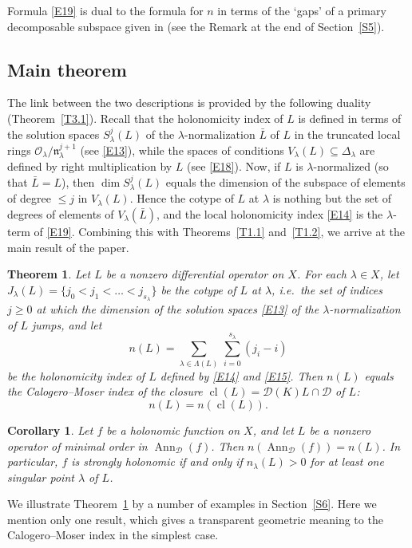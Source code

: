 \documentclass[11pt,reqno]{amsart}
\theoremstyle{plain}
\newtheorem{theorem}{Theorem}[section]
\newtheorem{corollary}{Corollary}[section]
\theoremstyle{definition}
\theoremstyle{remark}
\numberwithin{equation}{section}
\newcommand{\cD}{\mathcal{D}}
\newcommand{\cO}{\mathcal{O}}
\newcommand{\nl}{\mathfrak{n}_\lambda}
\newcommand{\Dl}{\Delta_\lambda}
\DeclareMathOperator{\Ann}{Ann}
\DeclareMathOperator{\cl}{cl}
\begin{document}
Formula \eqref{E19} is dual to the formula for $n$ in terms of the `gaps' of a primary
decomposable subspace given in \cite[(8.3)]{BerestWilson04} (see the Remark at the end of
Section~\ref{S5}).

\subsection*{Main theorem}
The link between the two descriptions is provided by the following duality
(Theorem~\ref{T3.1}). Recall that the holonomicity index of $L$ is defined in terms of the
solution spaces $S^j_\lambda(L)$ of the $\lambda$-normalization $\bar L$ of $L$ in the truncated
local rings $\cO_\lambda/\nl^{j+1}$ (see \eqref{E13}), while the spaces of conditions
$V_\lambda(L) \subseteq \Dl$ are defined by right multiplication by $L$ (see \eqref{E18}). Now, if
$L$ is $\lambda$-normalized (so that $\bar L = L$), then $\dim S^j_\lambda(L)$ equals the
dimension of the subspace of elements of degree $\le j$ in $V_\lambda(L)$. Hence the cotype of $L$ at $\lambda$ is nothing
but the set of degrees of elements of $V_\lambda(\bar L)$, and the local holonomicity index
\eqref{E14} is the $\lambda$-term of \eqref{E19}. Combining this with Theorems~\ref{T1.1}
and~\ref{T1.2}, we arrive at the main result of the paper.

\begin{theorem}
\label{T1.3}
Let $L$ be a nonzero differential operator on $X$. For each $\lambda \in X$, let
$J_\lambda(L) = \{ j_0 < j_1 < \ldots < j_{s_\lambda} \}$ be the cotype of $L$ at $\lambda$, i.e.\
the set of indices $j \ge 0$ at which the dimension of the solution spaces \eqref{E13} of the
$\lambda$-normalization of $L$ jumps, and let
\[
  n(L) = \sum_{\lambda \in \Lambda(L)}\, \sum_{i=0}^{s_\lambda} (j_i - i)
\]
be the holonomicity index of $L$ defined by \eqref{E14} and \eqref{E15}. Then $n(L)$ equals the
Calogero--Moser index of the closure $\cl(L) = \cD(K) L \cap \cD$ of $L$:
\[
  n(L) = n(\cl(L)) .
\]
\end{theorem}

\begin{corollary}
\label{C1.2}
Let $f$ be a holonomic function on $X$, and let $L$ be a nonzero operator of minimal order in
$\Ann_{\cD}(f)$. Then $n(\Ann_{\cD}(f)) = n(L)$. In particular, $f$ is strongly holonomic if and
only if $n_\lambda(L) > 0$ for at least one singular point $\lambda$ of $L$.
\end{corollary}

We illustrate Theorem~\ref{T1.3} by a number of examples in Section~\ref{S6}. Here we mention
only one result, which gives a transparent geometric meaning to the Calogero--Moser index in the
simplest case.
\end{document}
